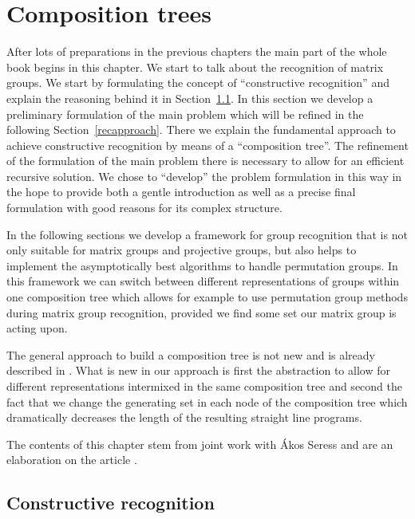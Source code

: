 
\chapter{Composition trees}
\label{chap:comptree}
%

After lots of preparations in the previous chapters
the main part of the whole book begins in this chapter. We start to talk
about the recognition of matrix groups. We start by formulating
the concept of ``constructive recognition'' and explain the reasoning
behind it in Section~\ref{constrrecog}. In this section we develop
a preliminary formulation of the main problem which will be refined
in the following Section~\ref{recapproach}. There we explain the fundamental
approach to achieve
constructive recognition by means of a ``composition tree''.
The refinement of the formulation of the main
problem there is necessary to allow for an efficient recursive solution.
We chose to ``develop'' the problem formulation in this way in the hope
to provide both a gentle introduction as well as a precise final
formulation with good reasons for its complex structure.

In the following sections we develop a
framework for group recognition that is not only suitable for matrix
groups and projective groups, but also helps to implement
the asymptotically best algorithms to handle permutation groups. In
this framework we can switch between different representations of
groups within one composition tree which allows for example to use 
%
permutation group methods during matrix group recognition, provided
we find some set our matrix group is acting upon.

The general approach to build a composition tree is not new and is
already described in \cite{MatGrpProj}. What is new in our approach
is first the abstraction to allow for different representations
intermixed in the same composition tree and second the fact that
we change the generating set in each node of the composition tree
which dramatically decreases the length of the resulting straight
line programs. 
%

The contents of this chapter stem from joint work with \'Akos Seress
and are an elaboration on the article \cite{AkosMaxISSAC}.

\section{Constructive recognition}
\label{constrrecog}

